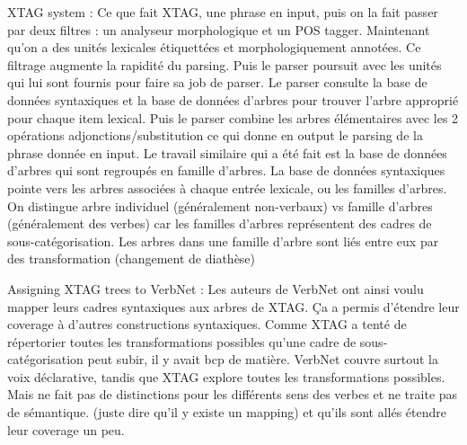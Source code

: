 XTAG system \citep{DoranXTAGSystemWide1994} : Ce que fait XTAG, une phrase en input, puis on la fait passer par deux filtres : un analyseur morphologique et un POS tagger. Maintenant qu'on a des unités lexicales étiquettées et morphologiquement annotées. Ce filtrage augmente la rapidité du parsing. Puis le parser poursuit avec les unités qui lui sont fournis pour faire sa job de parser. Le parser consulte la base de données syntaxiques et la base de données d'arbres pour trouver l'arbre approprié pour chaque item lexical. Puis le parser combine les arbres élémentaires avec les 2 opérations adjonctions/substitution ce qui donne en output le parsing de la phrase donnée en input. Le travail similaire qui a été fait est la base de données d'arbres qui sont regroupés en famille d'arbres. La base de données syntaxiques pointe vers les arbres associées à chaque entrée lexicale, ou les familles d'arbres. On distingue arbre individuel (généralement non-verbaux) vs famille d'arbres (généralement des verbes) car les familles d'arbres représentent des cadres de sous-catégorisation. Les arbres dans une famille d'arbre 
sont liés entre eux par des transformation (changement de diathèse)

Assigning XTAG trees to VerbNet\citep{W04-3326} : Les auteurs de VerbNet ont ainsi voulu mapper leurs cadres syntaxiques aux arbres de XTAG.
Ça a permis d'étendre leur coverage à d'autres constructions syntaxiques. Comme XTAG a tenté de répertorier toutes les transformations possibles qu'une cadre de sous-catégorisation peut subir, il y avait bcp de matière. VerbNet couvre surtout la voix déclarative, tandis que XTAG explore toutes les transformations possibles. Mais ne fait pas de distinctions pour les différents sens des verbes et ne traite pas de sémantique. (juste dire qu'il y existe un mapping) et qu'ils sont allés étendre leur coverage un peu.


